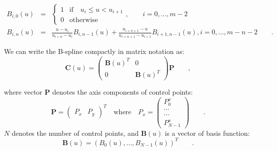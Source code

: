 \begin{eqnarray}
  \label{eq:4.2}
  B_{i,0}(u) &=&  \left\{
\begin{matrix} 
1 & \mathrm{if} \quad u_i \leq u < u_{i+1} \\
0 & \mathrm{otherwise}
\end{matrix}
\right.,\qquad i=0,\ldots, m{-}2 \\
B_{i,n}(u) &=& \frac{u - u_i}{u_{i+n} - u_i} B_{i,n-1}(u) + \frac{u_{i+n+1} - u}{u_{i+n+1} - u_{i+1}} B_{i+1,n-1}(u)
, i=0,\ldots, m{-}n{-}2 \qquad.
\end{eqnarray}

We can write the B-spline compactly in matrix notation as:
\begin{equation}
  \label{eq:4.3}
  \mathbf{C}(u) = 
  \begin{pmatrix}
\mathbf{B}(u)^T & 0 \\
0 &\mathbf{B}(u)^T
  \end{pmatrix}
\mathbf{P}\qquad,
\end{equation}

where vector $\mathbf{P}$ denotes the axis components of control
points:
\begin{equation}
  \label{eq:4.4}
  \mathbf{P} =
  \begin{pmatrix}
    P_x & P_y    
  \end{pmatrix}^T \quad \mathrm{where} \quad P_x =
  \begin{pmatrix}
    P_0^x\\
    \cdots\\
    \cdots\\
    P_{N-1}^x
  \end{pmatrix}\qquad .
\end{equation}
$N$ denotes the number of control points, and $\mathbf{B}(u)$ is a
vector of basis function:
\begin{equation}
  \label{eq:4.5}
  \mathbf{B}(u) = (B_0(u), \ldots, B_{N-1}(u))^T\qquad.
\end{equation}

